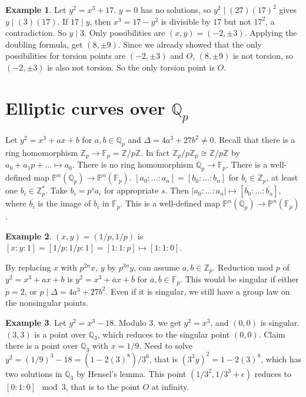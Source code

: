 \documentclass{article}
\newcommand{\F}{\mathbb{F}}
\newcommand{\Z}{\mathbb{Z}}
\newcommand{\Q}{\mathbb{Q}}
\renewcommand{\P}{\mathbb{P}}
\newcommand{\rb}[1]{\left( #1 \right)}
\renewcommand{\sb}[1]{\left[ #1 \right]}
\newcommand{\abs}[1]{\left\lvert #1 \right\rvert}
\theoremstyle{definition}\newtheorem{definition}{Definition}[section]
\theoremstyle{definition}\newtheorem{remark}[definition]{Remark}
\theoremstyle{definition}\newtheorem*{example}{Example}
\theoremstyle{definition}\newtheorem*{note}{Note}
\begin{document}
\begin{example}
Let $ y^2 = x^3 + 17 $. $ y = 0 $ has no solutions, so $ y^2 \mid \rb{27}\rb{17}^2 $ gives $ y \mid \rb{3}\rb{17} $. If $ 17 \mid y $, then $ x^3 = 17 - y^2 $ is divisible by $ 17 $ but not $ 17^2 $, a contradiction. So $ y \mid 3 $. Only possibilities are $ \rb{x, y} = \rb{-2, \pm 3} $. Applying the doubling formula, get $ \rb{8, \pm 9} $. Since we already showed that the only possibilities for torsion points are $ \rb{-2, \pm 3} $ and $ O $, $ \rb{8, \pm 9} $ is not torsion, so $ \rb{-2, \pm 3} $ is also not torsion. So the only torsion point is $ O $.
\end{example}


\section{Elliptic curves over $ \Q_p $}

Let $ y^2 = x^3 + ax + b $ for $ a, b \in \Q_p $ and $ \Delta = 4a^3 + 27b^2 \ne 0 $. Recall that there is a ring homomorphism $ \Z_p \to \F_p = \Z / p\Z $. In fact $ \Z_p / p\Z_p \cong \Z / p\Z $ by $ a_0 + a_1p + \dots \mapsto a_0 $. There is no ring homomorphism $ \Q_p \to \F_p $. There is a well-defined map $ \P^n\rb{\Q_p} \to \P^n\rb{\F_p} $. $ \sb{a_0 : \dots : a_n} = \sb{b_0 : \dots : b_n} $ for $ b_i \in \Z_p $, at least one $ b_i \in \Z_p^* $. Take $ b_i = p^sa_i $ for appropriate $ s $. Then $ \abs{a_0 : \dots : a_n} \mapsto \sb{\overline{b_0} : \dots : \overline{b_n}} $, where $ \overline{b_i} $ is the image of $ b_i $ in $ \F_p $. This is a well-defined map $ \P^n\rb{\Q_p} \to \P^n\rb{\F_p} $.

\begin{example}
$ \rb{x, y} = \rb{1 / p, 1 / p} $ is $ \sb{x : y : 1} = \sb{1 / p : 1 / p : 1} = \sb{1 : 1 : p} \mapsto \sb{1 : 1 : 0} $.
\end{example}

By replacing $ x $ with $ p^{2n}x $, $ y $ by $ p^{3n}y $, can assume $ a, b \in \Z_p $. Reduction mod $ p $ of $ y^2 = x^3 + ax + b $ is $ y^2 = x^3 + \overline{a}x + \overline{b} $ for $ \overline{a}, \overline{b} \in \F_p $. This would be singular if either $ p = 2 $, or $ p \mid \Delta = 4a^3 + 27b^2 $. Even if it is singular, we still have a group law on the nonsingular points.

\begin{example}
Let $ y^2 = x^3 - 18 $. Modulo $ 3 $, we get $ y^2 = x^3 $, and $ \rb{0, 0} $ is singular. $ \rb{3, 3} $ is a point over $ \Q_3 $, which reduces to the singular point $ \rb{0, 0} $. Claim there is a point over $ \Q_3 $ with $ x = 1 / 9 $. Need to solve $ y^2 = \rb{1 / 9}^3 - 18 = \rb{1 - 2\rb{3}^8} / 3^6 $, that is $ \rb{3^3y}^2 = 1 - 2\rb{3}^8 $, which has two solutions in $ \Q_3 $ by Hensel's lemma. This point $ \rb{1 / 3^2, 1 / 3^3 + \epsilon} $ reduces to $ \sb{0 : 1 : 0} \mod 3 $, that is to the point $ O $ at infinity.
\end{example}
\end{document}
